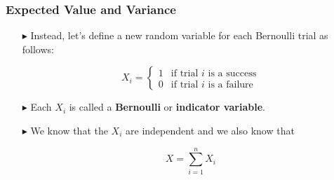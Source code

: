 \documentclass[12pt]{beamer}
\begin{document}
\begin{frame}
	\frametitle{Expected Value and Variance}
	
	\begin{itemize}
		\item[\color{blue}$\blacktriangleright$]Instead, let's define a new random variable for each Bernoulli trial as follows:
		
		\vspace{0.5cm}
		\[
		X_i = \begin{cases}
			1 & \text{if trial } i \text{ is a success} \\
			0 & \text{if trial } i \text{ is a failure}
		\end{cases}
		\]
		\vspace{0.5cm}
		
	\item[\color{blue}$\blacktriangleright$]Each $X_i$ is called a \textbf{Bernoulli} or \textbf{indicator variable}.
		
		\item[\color{blue}$\blacktriangleright$]We know that the $X_i$ are independent and we also know that
		
		\vspace{0.3cm}
		\[
		X = \sum_{i=1}^n X_i
		\]
	\end{itemize}
	
\end{frame}
\end{document}
